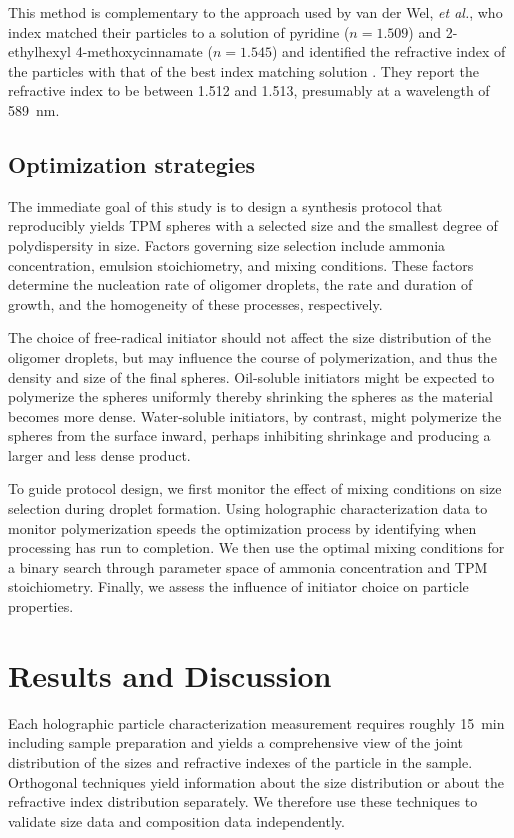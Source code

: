 \documentclass[journal=langd5,manuscript=article,layout=twocolumn]{achemso}
\begin{document}
This method is complementary to the approach used
by van der Wel, \emph{et al.},
who index matched their particles to a solution of
pyridine ($n=1.509$) and \num{2}-ethylhexyl
\num{4}-methoxycinnamate ($n = \num{1.545}$)
and identified the refractive index of the particles
with that of the best index matching solution \cite{vanderwel17}.
They report the refractive index to be between 
\num{1.512} and \num{1.513},
presumably at a wavelength of \SI{589}{\nm}.

\subsection{Optimization strategies}
\label{sec:optimizationstrategies}

The immediate goal of this study is to design
a synthesis protocol that reproducibly 
yields TPM spheres with a selected size and
the smallest degree of polydispersity in size.
Factors governing size selection include
ammonia concentration, emulsion stoichiometry,
and mixing conditions.
These factors determine the nucleation rate of oligomer
droplets, the rate and duration of growth, 
and the homogeneity of these processes, respectively.

The choice of free-radical initiator should not affect
the size distribution of the oligomer droplets, but
may influence the course of polymerization, and thus
the density and size of the final spheres.
Oil-soluble initiators might be expected to
polymerize the spheres uniformly thereby
shrinking the spheres as the material becomes more
dense.
Water-soluble initiators, by contrast, might
polymerize the spheres from the surface inward,
perhaps inhibiting shrinkage and producing a 
larger and less dense product.

To guide protocol design, we first monitor
the effect of mixing conditions on size selection
during droplet formation.
Using holographic characterization data to 
monitor polymerization speeds the optimization process
by identifying when processing has run to completion.
We then use the optimal mixing conditions for
a binary search through parameter space of
ammonia concentration and TPM stoichiometry.
Finally, we assess the influence of initiator
choice on particle properties.

\section{Results and Discussion}
\label{sec:results}

Each holographic particle characterization
measurement
requires roughly \SI{15}{\minute} including
sample preparation and yields 
a comprehensive view of the joint
distribution of the sizes and refractive
indexes of the particle in the sample.
Orthogonal techniques yield information
about the size distribution or about
the refractive index distribution separately.
We therefore use these techniques to validate
size data and composition data independently.
\end{document}
